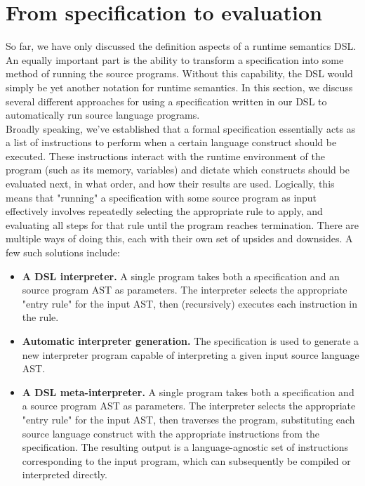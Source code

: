 \section{From specification to evaluation}
So far, we have only discussed the definition aspects of a runtime semantics \ac{DSL}. An equally important part is the ability to transform a specification into some method of running the source programs. Without this capability, the \ac{DSL} would simply be yet another notation for runtime semantics. In this section, we discuss several different approaches for using a specification written in our \ac{DSL} to automatically run source language programs. \\

Broadly speaking, we've established that a formal specification essentially acts as a list of instructions to perform when a certain language construct should be executed. These instructions interact with the runtime environment of the program (such as its memory, variables) and dictate which constructs should be evaluated next, in what order, and how their results are used. Logically, this means that "running" a specification with some source program as input effectively involves repeatedly selecting the appropriate rule to apply, and evaluating all steps for that rule until the program reaches termination. There are multiple ways of doing this, each with their own set of upsides and downsides. A few such solutions include:

\begin{itemize}
  \item \textbf{A \ac{DSL} interpreter.} A single program takes both a specification and an source program AST as parameters. The interpreter selects the appropriate "entry rule" for the input AST, then (recursively) executes each instruction in the rule.
  \item \textbf{Automatic interpreter generation.} The specification is used to generate a new interpreter program capable of interpreting a given input source language AST.
  \item \textbf{A \ac{DSL} meta-interpreter.} A single program takes both a specification and a source program AST as parameters. The interpreter selects the appropriate "entry rule" for the input AST, then traverses the program, substituting each source language construct with the appropriate instructions from the specification. The resulting output is a language-agnostic set of instructions corresponding to the input program, which can subsequently be compiled or interpreted directly. 
\end{itemize}

